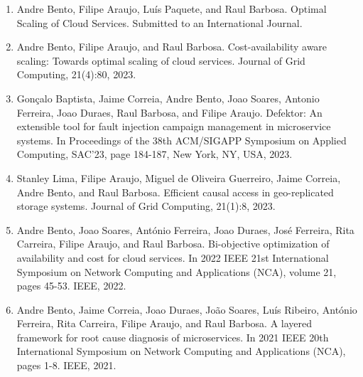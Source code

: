 \documentclass[a4paper,12pt]{memoir}
\begin{document}
\begin{enumerate}
	\item Andre Bento, Filipe Araujo, Luís Paquete, and Raul Barbosa. 
	Optimal Scaling of Cloud Services. Submitted to an International Journal.
	\item Andre Bento, Filipe Araujo, and Raul Barbosa. Cost-availability aware
	scaling: Towards optimal scaling of cloud services. Journal of Grid 
	Computing, 21(4):80, 2023.%
	\item Gonçalo Baptista, Jaime Correia, Andre Bento, Joao Soares, Antonio 
	Ferreira, Joao Duraes, Raul Barbosa, and Filipe Araujo. Defektor: An 
	extensible tool for fault injection campaign management in microservice 
	systems. In Proceedings of the 38th ACM/SIGAPP Symposium on Applied 
	Computing, SAC'23, page 184-187, New York, NY, USA, 2023.%
	\item Stanley Lima, Filipe Araujo, Miguel de Oliveira Guerreiro, Jaime 
	Correia, Andre Bento, and Raul Barbosa. Efficient causal access in 
	geo-replicated storage systems. Journal of Grid Computing, 21(1):8, 2023.
	\item Andre Bento, Joao Soares, António Ferreira, Joao Duraes, José 
	Ferreira, Rita Carreira, Filipe Araujo, and Raul Barbosa. Bi-objective 
	optimization of availability and cost for cloud services. In 2022 IEEE 21st 
	International Symposium on Network Computing and Applications (NCA), volume 
	21, pages 45-53. IEEE, 2022.%
	\item Andre Bento, Jaime Correia, Joao Duraes, João Soares, Luís Ribeiro,
	António Ferreira, Rita Carreira, Filipe Araujo, and Raul Barbosa. A layered 
	framework for root cause diagnosis of microservices. In 2021 IEEE 20th 
	International Symposium on Network Computing and Applications (NCA), 
	pages 1-8. IEEE, 2021.%

\end{enumerate}
\end{document}

